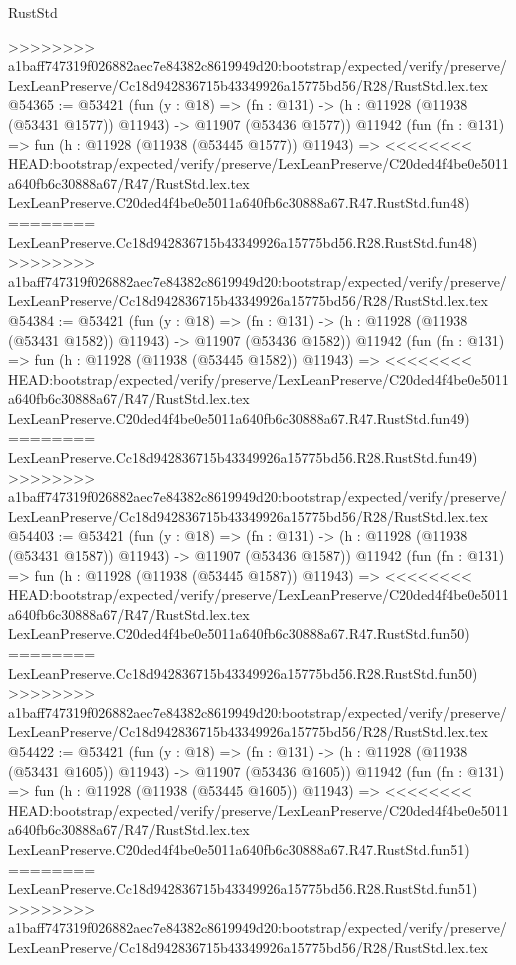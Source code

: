 \begin{lexlean}{RustStd}
\begin{coremodule}
{\begin{coremodule}
{{{{{{{{{{{{{{{{{{{{{{{{{{{{{{{{{{{{{{{{{{{{{{{{{{{{{{{{{{{{{{{{{{{{{{{{{{{{{{{{>>>>>>>> a1baff747319f026882aec7e84382c8619949d20:bootstrap/expected/verify/preserve/LexLeanPreserve/Cc18d942836715b43349926a15775bd56/R28/RustStd.lex.tex
@54365 := @53421
    (fun (y : @18) =>
    (fn : @131) -> (h : @11928 (@11938 (@53431 @1577)) @11943) -> @11907 (@53436 @1577))
    @11942
    (fun (fn : @131) =>
    fun (h : @11928 (@11938 (@53445 @1577)) @11943) =>
<<<<<<<< HEAD:bootstrap/expected/verify/preserve/LexLeanPreserve/C20ded4f4be0e5011a640fb6c30888a67/R47/RustStd.lex.tex
    LexLeanPreserve.C20ded4f4be0e5011a640fb6c30888a67.R47.RustStd.fun48)
========
    LexLeanPreserve.Cc18d942836715b43349926a15775bd56.R28.RustStd.fun48)
>>>>>>>> a1baff747319f026882aec7e84382c8619949d20:bootstrap/expected/verify/preserve/LexLeanPreserve/Cc18d942836715b43349926a15775bd56/R28/RustStd.lex.tex
@54384 := @53421
    (fun (y : @18) =>
    (fn : @131) -> (h : @11928 (@11938 (@53431 @1582)) @11943) -> @11907 (@53436 @1582))
    @11942
    (fun (fn : @131) =>
    fun (h : @11928 (@11938 (@53445 @1582)) @11943) =>
<<<<<<<< HEAD:bootstrap/expected/verify/preserve/LexLeanPreserve/C20ded4f4be0e5011a640fb6c30888a67/R47/RustStd.lex.tex
    LexLeanPreserve.C20ded4f4be0e5011a640fb6c30888a67.R47.RustStd.fun49)
========
    LexLeanPreserve.Cc18d942836715b43349926a15775bd56.R28.RustStd.fun49)
>>>>>>>> a1baff747319f026882aec7e84382c8619949d20:bootstrap/expected/verify/preserve/LexLeanPreserve/Cc18d942836715b43349926a15775bd56/R28/RustStd.lex.tex
@54403 := @53421
    (fun (y : @18) =>
    (fn : @131) -> (h : @11928 (@11938 (@53431 @1587)) @11943) -> @11907 (@53436 @1587))
    @11942
    (fun (fn : @131) =>
    fun (h : @11928 (@11938 (@53445 @1587)) @11943) =>
<<<<<<<< HEAD:bootstrap/expected/verify/preserve/LexLeanPreserve/C20ded4f4be0e5011a640fb6c30888a67/R47/RustStd.lex.tex
    LexLeanPreserve.C20ded4f4be0e5011a640fb6c30888a67.R47.RustStd.fun50)
========
    LexLeanPreserve.Cc18d942836715b43349926a15775bd56.R28.RustStd.fun50)
>>>>>>>> a1baff747319f026882aec7e84382c8619949d20:bootstrap/expected/verify/preserve/LexLeanPreserve/Cc18d942836715b43349926a15775bd56/R28/RustStd.lex.tex
@54422 := @53421
    (fun (y : @18) =>
    (fn : @131) -> (h : @11928 (@11938 (@53431 @1605)) @11943) -> @11907 (@53436 @1605))
    @11942
    (fun (fn : @131) =>
    fun (h : @11928 (@11938 (@53445 @1605)) @11943) =>
<<<<<<<< HEAD:bootstrap/expected/verify/preserve/LexLeanPreserve/C20ded4f4be0e5011a640fb6c30888a67/R47/RustStd.lex.tex
    LexLeanPreserve.C20ded4f4be0e5011a640fb6c30888a67.R47.RustStd.fun51)
========
    LexLeanPreserve.Cc18d942836715b43349926a15775bd56.R28.RustStd.fun51)
>>>>>>>> a1baff747319f026882aec7e84382c8619949d20:bootstrap/expected/verify/preserve/LexLeanPreserve/Cc18d942836715b43349926a15775bd56/R28/RustStd.lex.tex
}}}}}}}}}}}}}}}}}}}}}}}}}}}}}}}}}}}}}}}}}}}}}}}}}}}}}}}}}}}}}}}}}}}}}}}}}}}}}}}}
\end{coremodule}}
\end{coremodule}
\end{lexlean}
